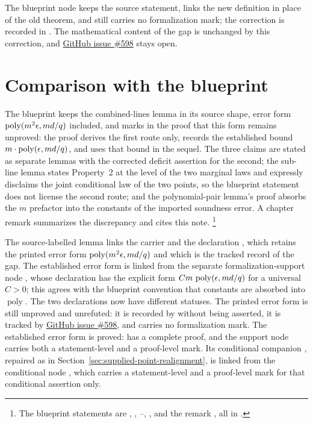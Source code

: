 \documentclass[11pt]{article}
\DeclareMathOperator{\poly}{poly}
\renewcommand{\ghissue}[1]{%
  \href{https://github.com/Dengnifer/MIPStarRE-QPBT/issues/#1}{GitHub issue \##1}}
\begin{document}
The blueprint node  keeps the source statement, links the
new definition in place of the old theorem, and still carries no formalization
mark; the correction is recorded in .  The
mathematical content of the gap is unchanged by this correction, and
\ghissue{598} stays open.

\section{Comparison with the blueprint}

The blueprint \cite{MIPStarREBlueprint} keeps the combined-lines lemma in
its source shape, error form $\poly(m^2\eps, md/q)$ included, and marks in
the proof that this form remains unproved: the proof derives the first route
only, records the established bound $m \cdot \poly(\eps, md/q)$, and uses
that bound in the sequel.  The
three claims are stated as separate lemmas with the corrected deficit
assertion for the second; the sub-line lemma states Property~2 at the
level of the two marginal laws and expressly disclaims the joint
conditional law of the two points, so the blueprint statement does not
license the second route; and the polynomial-pair lemma's proof absorbs
the $m$ prefactor into the constants of the imported soundness error.  A
chapter remark summarizes the discrepancy and cites this note.%
\footnote{The blueprint statements are ,
, --,
, and the remark
, all in
.}

The source-labelled lemma links the carrier
 and the declaration
, which retains the printed error form
$\poly(m^2\eps,md/q)$ and which is the tracked record of the gap.  The
established error form is linked from the separate formalization-support node
, whose declaration
 has the explicit form
$C m\,\poly(\eps,md/q)$ for a universal $C>0$; this agrees with the blueprint
convention that constants are absorbed into $\poly$.  The two declarations now
have different statuses.  The printed error form is still unproved and
unrefuted: it is recorded by  without
being asserted, it is tracked by \ghissue{598}, and
 carries no formalization mark.  The established error form
is proved:  has a complete proof,
and the support node  carries both a
statement-level and a proof-level mark.  Its conditional companion
, repaired as in
Section~\ref{sec:supplied-point-realignment}, is linked from the conditional
node , which carries a
statement-level and a proof-level mark for that conditional assertion only.
\end{document}
